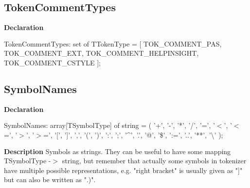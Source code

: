 \documentclass{report}
\newif\ifpdf
\begin{document}
\subsection*{TokenCommentTypes}
\fi
\label{PasDoc_Tokenizer-TokenCommentTypes}
\begin{list}{}{
\setlength{\itemindent}{0cm}
\setlength{\listparindent}{0cm}
\setlength{\leftmargin}{\evensidemargin}
\addtolength{\leftmargin}{\tmplength}
\settowidth{\labelsep}{X}
\addtolength{\leftmargin}{\labelsep}
\setlength{\labelwidth}{\tmplength}
}
\item[\textbf{Declaration}\hfill]
\ifpdf
\begin{flushleft}
\fi
\begin{ttfamily}
TokenCommentTypes: set of TTokenType =
  [ TOK{\_}COMMENT{\_}PAS, TOK{\_}COMMENT{\_}EXT,
  TOK{\_}COMMENT{\_}HELPINSIGHT,
  TOK{\_}COMMENT{\_}CSTYLE ];\end{ttfamily}

\ifpdf
\end{flushleft}
\fi

\end{list}
\ifpdf
\subsection*{\large{\textbf{SymbolNames}}\normalsize\hspace{1ex}\hrulefill}
\else
\subsection*{SymbolNames}
\fi
\label{PasDoc_Tokenizer-SymbolNames}
\begin{list}{}{
\setlength{\itemindent}{0cm}
\setlength{\listparindent}{0cm}
\setlength{\leftmargin}{\evensidemargin}
\addtolength{\leftmargin}{\tmplength}
\settowidth{\labelsep}{X}
\addtolength{\leftmargin}{\labelsep}
\setlength{\labelwidth}{\tmplength}
}
\item[\textbf{Declaration}\hfill]
\ifpdf
\begin{flushleft}
\fi
\begin{ttfamily}
SymbolNames: array[TSymbolType] of string =
  ( '+', '-', '*', '/', '=', '{$<$}', '{$<$}=', '{$>$}', '{$>$}=', '[', ']', ',',
    '(', ')', ':', ';', '{\^{}}', '.', '@', '{\$}', ':=', '..', '**', '{\textbackslash}' );\end{ttfamily}

\ifpdf
\end{flushleft}
\fi

\par
\item[\textbf{Description}]
Symbols as strings. They can be useful to have some mapping TSymbolType {-}{$>$} string, but remember that actually some symbols in tokenizer have multiple possible representations, e.g. "right bracket" is usually given as "]" but can also be written as ".)".

\end{list}
\ifpdf
\end{document}
